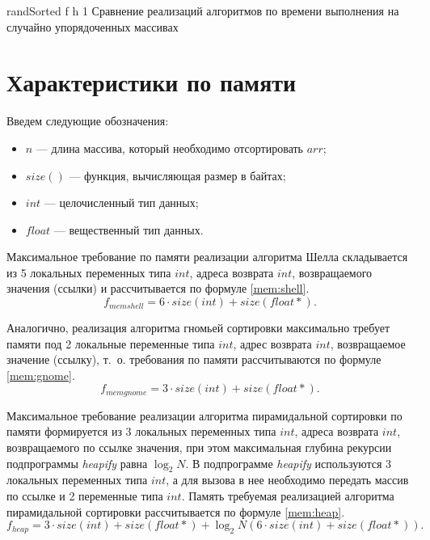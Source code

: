 {randSorted} %
{f} %
{h} %
{1\textwidth} %
{Сравнение реализаций алгоритмов по времени выполнения на случайно упорядоченных массивах} %

\clearpage


\section{Характеристики по памяти}

Введем следующие обозначения:
\begin{itemize}
	\item $n$ --- длина массива, который необходимо отсортировать $arr$;
	\item $size()$ --- функция, вычисляющая размер в байтах;
	\item $int$ --- целочисленный тип данных;
	\item $float$ --- вещественный тип данных.
\end{itemize}

Максимальное требование по памяти реализации алгоритма Шелла складывается из 5 локальных переменных типа $int$, адреса возврата $int$, возвращаемого значения (ссылки) и рассчитывается по формуле \eqref{mem:shell}.
\begin{equation}
	\label{mem:shell}
	f_{memshell} = 6 \cdot size(int) + size(float *).
\end{equation}

Аналогично, реализация алгоритма гномьей сортировки максимально требует памяти под 2 локальные переменные типа $int$, адрес возврата $int$, возвращаемое значение (ссылку), т.~о. требования по памяти рассчитываются по формуле \eqref{mem:gnome}.
\begin{equation}
	\label{mem:gnome}
	f_{memgnome} = 3 \cdot size(int) + size(float *).
\end{equation}

Максимальное требование реализации алгоритма пирамидальной сортировки по памяти формируется из 3 локальных переменных типа $int$, адреса возврата $int$, возвращаемого по ссылке значения, при этом максимальная глубина рекурсии подпрограммы \textit{heapify} равна $\log_2 N$. 
В подпрограмме \textit{heapify} используются 3 локальных переменных типа $int$, а для вызова в нее необходимо передать массив по ссылке и 2 переменные типа $int$. 
Память требуемая реализацией алгоритма пирамидальной сортировки рассчитывается по формуле \eqref{mem:heap}.
\begin{equation}
	\label{mem:heap}
	f_{heap} = 3 \cdot size(int) + size(float *) + \log_2 N (6 \cdot size(int) + size(float *)).
\end{equation}

